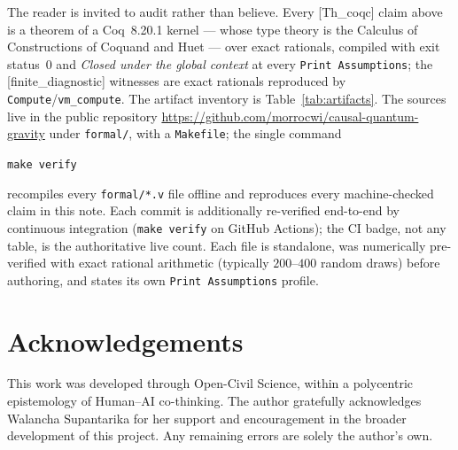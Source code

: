 \documentclass[10pt,twocolumn]{article}
\theoremstyle{definition}
\newcommand{\Thq}{\textsf{[Th\_coqc]}}
\newcommand{\Fin}{\textsf{[finite\_diagnostic]}}
\newcommand{\code}[1]{\texttt{#1}}
\begin{document}
The reader is invited to audit rather than believe. Every \Thq{} claim above is a theorem of
a Coq~8.20.1 kernel \cite{coq} --- whose type theory is the Calculus of Constructions of
Coquand and Huet \cite{coquandhuet1988} --- over exact rationals, compiled with exit
status~0 and \emph{Closed under the global context} at every \code{Print Assumptions}; the \Fin{} witnesses are exact
rationals reproduced by \code{Compute}/\code{vm\_compute}. The artifact inventory is
Table~\ref{tab:artifacts}. The sources live in the public repository
\url{https://github.com/morrocwi/causal-quantum-gravity} under \code{formal/}, with a
\code{Makefile}; the single command
\begin{center}\code{make verify}\end{center}
recompiles every \code{formal/*.v} file offline and reproduces every machine-checked claim in
this note. Each commit is additionally re-verified end-to-end by continuous integration
(\code{make verify} on GitHub Actions); the CI badge, not any table, is the authoritative live
count. Each file is standalone, was numerically pre-verified with exact rational arithmetic
(typically $200$--$400$ random draws) before authoring, and states its own
\code{Print Assumptions} profile.

\section*{Acknowledgements}
This work was developed through Open-Civil Science, within a polycentric epistemology of
Human--AI co-thinking. The author gratefully acknowledges Walancha Supantarika for her
support and encouragement in the broader development of this project. Any remaining errors are
solely the author's own.

\end{document}
